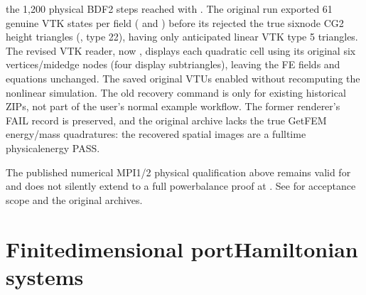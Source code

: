 \documentclass[letterpaper,10pt,english]{sphinxmanual}
\begin{document}
\sphinxAtStartPar
{} the 1,200
physical BDF2 steps reached 
with .
The original run exported 61 genuine VTK
states per field ( and )
before its  rejected the true
six\sphinxhyphen{}node CG2 height triangles
(, type 22),
having only anticipated linear VTK type 5
triangles. The revised VTK reader, now
, displays
each quadratic cell using its original
six vertices/mid\sphinxhyphen{}edge nodes (four display
subtriangles), leaving the FE fields
and equations unchanged. The saved original VTUs enabled 
without recomputing the nonlinear simulation.
The old recovery command is only for existing historical ZIPs,
not part of the user’s normal example workflow.
The former renderer’s FAIL record is
preserved, and the original archive lacks
the true GetFEM energy/mass quadratures:
the recovered spatial images are 
a full\sphinxhyphen{}time physical\sphinxhyphen{}energy PASS.

\sphinxAtStartPar
The published numerical MPI1/2 physical
qualification above remains valid for
 and does not silently extend
to a full power\sphinxhyphen{}balance proof at .
See
for acceptance scope and the original archives.

\sphinxstepscope


\section{Finite\sphinxhyphen{}dimensional port\sphinxhyphen{}Hamiltonian systems}
\label{\detokenize{lumped:finite-dimensional-port-hamiltonian-systems}}\label{\detokenize{lumped::doc}}
\end{document}
